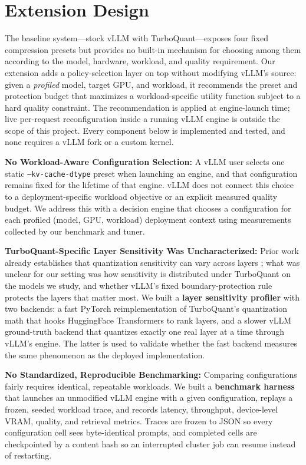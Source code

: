 \documentclass[10pt]{article}
\begin{document}
\section{Extension Design}
The baseline system---stock vLLM with TurboQuant---exposes four fixed compression presets but provides no built-in mechanism for choosing among them according to the model, hardware, workload, and quality requirement. Our extension adds a policy-selection layer on top without modifying vLLM's source: given a \emph{profiled} model, target GPU, and workload, it recommends the preset and protection budget that maximizes a workload-specific utility function subject to a hard quality constraint. The recommendation is applied at engine-launch time; live per-request reconfiguration inside a running vLLM engine is outside the scope of this project. Every component below is implemented and tested, and none requires a vLLM fork or a custom kernel.

\textbf{No Workload-Aware Configuration Selection:} A vLLM user selects one static \texttt{--kv-cache-dtype} preset when launching an engine, and that configuration remains fixed for the lifetime of that engine. vLLM does not connect this choice to a deployment-specific workload objective or an explicit measured quality budget. We address this with a decision engine that chooses a configuration for each profiled (model, GPU, workload) deployment context using measurements collected by our benchmark and tuner.

\textbf{TurboQuant-Specific Layer Sensitivity Was Uncharacterized:} Prior work already establishes that quantization sensitivity can vary across layers \cite{hawq,kvquant,kvtuner,kvmix}; what was unclear for our setting was how sensitivity is distributed under TurboQuant on the models we study, and whether vLLM's fixed boundary-protection rule protects the layers that matter most. We built a \textbf{layer sensitivity profiler} with two backends: a fast PyTorch reimplementation of TurboQuant's quantization math that hooks HuggingFace Transformers to rank layers, and a slower vLLM ground-truth backend that quantizes exactly one real layer at a time through vLLM's engine. The latter is used to validate whether the fast backend measures the same phenomenon as the deployed implementation.

\textbf{No Standardized, Reproducible Benchmarking:} Comparing configurations fairly requires identical, repeatable workloads. We built a \textbf{benchmark harness} that launches an unmodified vLLM engine with a given configuration, replays a frozen, seeded workload trace, and records latency, throughput, device-level VRAM, quality, and retrieval metrics. Traces are frozen to JSON so every configuration cell sees byte-identical prompts, and completed cells are checkpointed by a content hash so an interrupted cluster job can resume instead of restarting.
\end{document}
